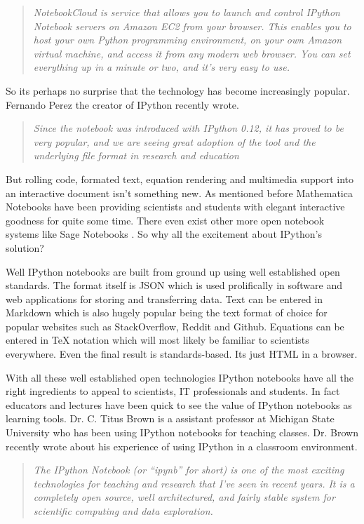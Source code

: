 \documentclass[11pt, a4paper]{article}  %
\begin{document}
\begin{multicols}{2}
\begin{quote}
\textit{NotebookCloud is service that allows you to launch and control IPython
Notebook servers on Amazon EC2 from your browser. This enables you to host
your own Python programming environment, on your own Amazon virtual machine,
and access it from any modern web browser. You can set everything up in a
minute or two, and it's very easy to use.}
\end{quote}

So its perhaps no surprise that the technology has become increasingly popular.
Fernando Perez the creator of IPython recently wrote. \cite{perez}

\begin{quote}
\textit{Since the notebook was introduced with IPython 0.12, it has proved to
be very popular, and we are seeing great adoption of the tool and the
underlying file format in research and education}
\end{quote}

But rolling code, formated text, equation rendering and multimedia support
into an interactive document isn't something new. As mentioned before
Mathematica Notebooks have been providing scientists and students with elegant
interactive goodness for quite some time. There even exist other more open
notebook systems like Sage Notebooks \cite{sage}. So why all the excitement
about IPython's solution?

Well IPython notebooks are built from ground up using well established open
standards. The format itself is JSON which is used prolifically in software and
web applications for storing and transferring data. Text can be entered in
Markdown which is also hugely popular being the text format of choice for
popular websites such as StackOverflow, Reddit and Github. Equations can be
entered in TeX notation which will most likely be familiar to scientists
everywhere. Even the final result is standards-based. Its just HTML in a
browser.

With all these well established open technologies IPython notebooks have all
the right ingredients to appeal to scientists, IT professionals and students.
In fact educators and lectures have been quick to see the value of IPython
notebooks as learning tools. Dr. C. Titus Brown is a assistant professor at
Michigan State University who has been using IPython notebooks for teaching
classes. Dr. Brown recently wrote about his experience of using IPython in a
classroom environment. \cite{brown}

\begin{quote} 
\textit{The IPython Notebook (or ``ipynb'' for short) is one of the most
exciting technologies for teaching and research that I've seen in recent
years. It is a completely open source, well architectured, and fairly stable
system for scientific computing and data exploration.}
\end{quote}


\end{multicols}
\end{document}
